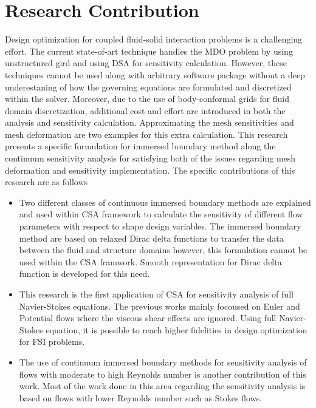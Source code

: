 \section{Research Contribution}
Design optimization for coupled fluid-solid interaction problems is a challenging effort. The current state-of-art technique handles the MDO problem by using unstructured gird and using DSA for sensitivity calculation. However, these techniques cannot be used along with arbitrary software package without a deep underestaning of how the governing equations are formulated and discretized within the solver. Moreover, due to the use of body-conformal grids for fluid domain discretization, additional cost and effort are introduced in both the analysis and sensitivity calculation. Approximating the mesh sensitivities and mesh deformation are two examples for this extra calculation. This research presents a specific formulation for immersed boundary method along the continuum sensitivity analysis for satisfying both of the issues regarding mesh deformation and sensitivity implementation. The specific contributions of this research are as follows

\begin{itemize}
	\item Two different classes of continuous immersed boundary methods are explained and used within CSA framework to calculate the sensitivity of different flow parameters with respect to shape design variables. The immersed boundary method are based on relaxed Dirac delta functions to transfer the data between the fluid and structure domains however, this formulation cannot be used within the CSA framwork. Smooth representation for Dirac delta function is developed for this need.
	\item This research is the first application of CSA for sensitivity analysis of full Navier-Stokes equations. The previous works mainly focoused on Euler and Potential flows where the viscous shear effects are ignored. Using full Navier-Stokes equation, it is possible to reach higher fidelities in design optimization for FSI problems.
	\item The use of continuum immersed boundary methods for sensitivity analysis of flows with moderate to high Reynolds number is another contribution of this work. Most of the work done in this area regarding the sensitivity analysis is based on flows with lower Reynolds number such as Stokes flows.
\end{itemize}
